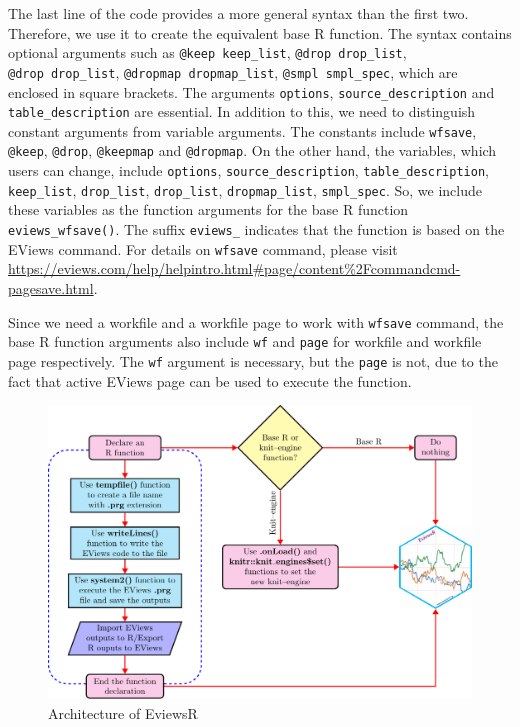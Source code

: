 The last line of the code provides a more general syntax than the first two. Therefore, we use it to create the equivalent base R function. The syntax contains optional arguments such as \texttt{@keep\ keep\_list}, \texttt{@drop\ drop\_list}, \texttt{@drop\ drop\_list}, \texttt{@dropmap\ dropmap\_list}, \texttt{@smpl\ smpl\_spec}, which are enclosed in square brackets. The arguments \texttt{options}, \texttt{source\_description} and \texttt{table\_description} are essential. In addition to this, we need to distinguish constant arguments from variable arguments. The constants include \texttt{wfsave}, \texttt{@keep}, \texttt{@drop}, \texttt{@keepmap} and \texttt{@dropmap}. On the other hand, the variables, which users can change, include \texttt{options}, \texttt{source\_description}, \texttt{table\_description}, \texttt{keep\_list}, \texttt{drop\_list}, \texttt{drop\_list}, \texttt{dropmap\_list}, \texttt{smpl\_spec}. So, we include these variables as the function arguments for the base R function \texttt{eviews\_wfsave()}. The suffix \texttt{eviews\_} indicates that the function is based on the EViews command. For details on \texttt{wfsave} command, please visit \url{https://eviews.com/help/helpintro.html\#page/content\%2Fcommandcmd-pagesave.html}.

Since we need a workfile and a workfile page to work with \texttt{wfsave} command, the base R function arguments also include \texttt{wf} and \texttt{page} for workfile and workfile page respectively. The \texttt{wf} argument is necessary, but the \texttt{page} is not, due to the fact that active EViews page can be used to execute the function.

\begin{figure}

{\centering \includegraphics[height=0.35\textheight]{EviewsR_files/figure-latex/EngineSteps-1} 

}

\caption{Architecture of EviewsR}\label{fig:EngineSteps}
\end{figure}

